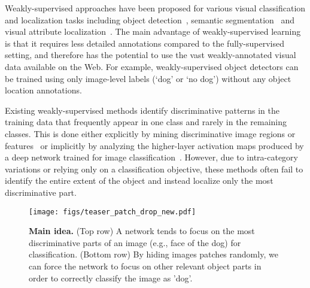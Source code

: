 \documentclass[10pt,twocolumn,letterpaper]{article}
\begin{document}
Weakly-supervised approaches have been proposed for various visual classification and localization tasks including object detection~\cite{weber-eccv2000,fergus-cvpr2003,Crandall-ECCV2006,siva-eccv2012,bilen-bmcv2014,wang-eccv2014,song-nips2014,cinbis-arxiv2015,Oquab-cvpr15,zhou-cvpr2016,krishna-cvpr2016}, semantic segmentation~\cite{pathak-ICCV2015,khoreva-cvpr2016} and visual attribute localization~\cite{berg-eccv2010,wang-cvpr2013b,Xiao-iccv2015,Wang-CVPR2016,krishna-eccv2016}.  The main advantage of weakly-supervised learning is that it requires less detailed annotations compared to the fully-supervised setting, and therefore has the potential to use the vast weakly-annotated visual data available on the Web.  For example, weakly-supervised object detectors can be trained using only image-level labels (`dog' or `no dog') without any object location annotations.

Existing weakly-supervised methods identify discriminative patterns in the training data that frequently appear in one class and rarely in the remaining classes.  This is done either explicitly by mining discriminative image regions or features~\cite{weber-eccv2000,fergus-cvpr2003,Crandall-ECCV2006,siva-eccv2012,bilen-bmcv2014,song-icml2014,song-nips2014,cinbis-arxiv2015,krishna-cvpr2016} or implicitly by analyzing the higher-layer activation maps produced by a deep network trained for image classification~\cite{simonyan-iclr2014,Oquab-cvpr15,zhou-cvpr2016}.  However, due to intra-category variations or relying only on a classification objective, these methods often fail to identify the entire extent of the object and instead localize only the most discriminative part.

\begin{figure}[t!]
\centering
    \texttt{[image: figs/teaser\_patch\_drop\_new.pdf]}
    \caption{\textbf{Main idea.}  (Top row) A network tends to focus on the most discriminative parts of an image (e.g., face of the dog) for classification. (Bottom row) By hiding images patches randomly, we can force the network to focus on other relevant object parts in order to correctly classify the image as 'dog'.}
    \label{fig:teaser}
    \vspace*{-0.1in}
\end{figure}
\end{document}
